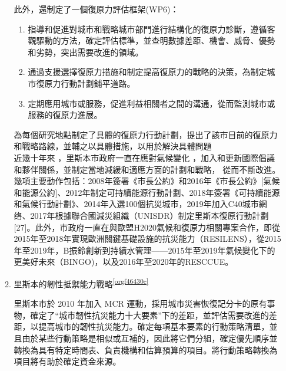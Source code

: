 \documentclass[a4paper,12pt]{article}
\begin{document}
\begin{enumerate}
\begin{enumerate}
此外，還制定了一個復原力評估框架(WP6)：\\
\begin{enumerate}
\item 指導和促進對城市和戰略城市部門進行結構化的復原力診斷，遵循客觀驅動的方法，確定評估標準，並查明數據差距、機會、威脅、優勢和劣勢，突出需要改進的領域。\\
\item 通過支援選擇復原力措施和制定提高復原力的戰略的決策，為制定城市復原力行動計劃鋪平道路。\\
\item 定期應用城市或服務，促進利益相關者之間的溝通，從而監測城市或服務的復原力進展。\\
\end{enumerate}

為每個研究地點制定了具體的復原力行動計劃，提出了該市目前的復原力和戰略路線，並輔之以具體措施，以用於解決具體問題\\

近幾十年來 ，里斯本市政府一直在應對氣候變化 ，加入和更新國際倡議 和夥伴關係，並制定當地減緩和適應方面的計劃和戰略， 從而不斷改進。幾項主要動作包括：2008年簽署《市長公約》和2016年《市長公約》[氣候和能源公約]、2012年制定可持續能源行動計劃、2018年簽署《可持續能源和氣候行動計劃》、2014年入選100個抗災城市，2019年加入C40城市網络、2017年根據聯合國減災組織（UNISDR）制定里斯本復原行動計劃[27]。此外，市政府一直在與歐盟H2020氣候和復原力相關專案合作，即從2015年至2018年實現歐洲關鍵基礎設施的抗災能力（RESILENS），從2015年至2019年，B振鈴創新到持續水管理——2015年至2019年氣候變化下的更美好未來（BINGO)，以及2016年至2020年的RESCCUE。\\
\item 里斯本的韌性抵禦能力戰略\textsuperscript{\ref{orgf46430c}}
\label{sec:orgc1d0574}

里斯本市於 2010 年加入 MCR 運動，採用城市災害恢復記分卡的原有事物，確定了“城市韌性抗災能力十大要素”下的差距，並評估需要改進的差距，以提高城市的韌性抗災能力。確定每項基本要素的行動策略清單，並且由於某些行動策略是相似或互補的，因此將它們分組，確定優先順序並轉換為具有特定時間表、負責機構和估算預算的項目。將行動策略轉換為項目將有助於確定資金來源。\\


\end{enumerate}
\end{enumerate}
\end{document}
